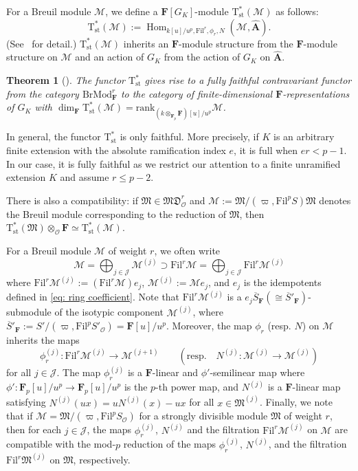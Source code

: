 \documentclass[11pt]{amsart}
\theoremstyle{definition}
\numberwithin{equation}{subsection}
\theoremstyle{plain}
\newtheorem{theo}[equation]{Theorem}
\theoremstyle{plain}
\theoremstyle{plain}
\theoremstyle{plain}
\theoremstyle{plain}
\theoremstyle{plain}
\theoremstyle{plain}
\theoremstyle{plain}
\theoremstyle{plain}
\theoremstyle{plain}
\theoremstyle{plain}
\theoremstyle{plain}
\theoremstyle{definition}
\theoremstyle{definition}
\theoremstyle{definition}
\theoremstyle{remark}
\renewcommand{\(}{\textup{(}}
\renewcommand{\)}{\textup{)}}
\DeclareMathOperator{\Hom}{Hom}
\newcommand{\F}{\mathbf{F}}
\newcommand{\barS}{\overline{S}}
\newcommand{\Tst}{\mathrm{T}_{\mathrm{st}}}
\newcommand{\cM}{\mathcal{M}}
\newcommand{\fM}{\mathfrak{M}}
\newcommand{\Fil}{\mathrm{Fil}}
\newcommand{\cO}{\mathcal{O}}
\newcommand{\cJ}{\mathcal{J}}
\begin{document}
For a Breuil module $\cM$, we define a $\F[G_K]$-module $\Tst^\ast(\cM)$ as follows: 
\begin{equation}\label{eq: definition of Tst}
\Tst^\ast(\cM):=\Hom_{k[u]/u^{p},\Fil^r,\phi_{r},N}(\cM,\widehat{\mathbf{A}}).
\end{equation} 
(See~\cite{EGH} for detail.) $\Tst^\ast(\cM)$ inherits an $\F$-module structure from the $\F$-module structure on $\cM$ and an action of $G_{K}$ from the action of $G_{K}$ on $\widehat{\mathbf{A}}$.
\begin{theo}[\cite{Caruso}]
The functor $\Tst^\ast$ gives rise to a fully faithful contravariant functor from the category $\mathrm{BrMod}^{r}_{\F}$ to the category of finite-dimensional $\F$-representations of $G_{K}$ with $\dim_{\F}\Tst^\ast(\cM)=\mathrm{rank}_{(k\otimes_{\F_p}\F)[u]/u^{p}}\cM$.
\end{theo}

In general, the functor $\Tst^\ast$ is only faithful. More precisely, if $K$ is an arbitrary finite extension with the absolute ramification index $e$, it is full when $er<p-1$. In our case, it is fully faithful as we restrict our attention to a finite unramified extension $K$ and assume $r\leq p-2$.


There is also a compatibility: if $\fM\in\mathfrak{MD}^{r}_{\cO}$ and $\cM:=\fM/(\varpi,\Fil^{p}S)\fM$ denotes the Breuil module corresponding to the reduction of $\fM$, then $\Tst^\ast(\fM)\otimes_{\cO}\F\simeq\Tst^\ast(\cM)$.



For a Breuil module $\cM$ of weight $r$, we often write
$$\cM=\bigoplus_{j\in\cJ}\cM^{(j)}\supset \Fil^r\cM=\bigoplus_{j\in\cJ} \Fil^r\cM^{(j)}$$
where $\Fil^r\cM^{(j)}:=(\Fil^r\cM) e_j$, $\cM^{(j)}:=\cM e_j$, and $e_j$ is the idempotents defined in \eqref{eq: ring coefficient}. Note that $\Fil^r\cM^{(j)}$ is a $e_j\barS_\F (\cong \barS'_\F)$-submodule of the isotypic component $\cM^{(j)}$, where $\barS'_\F:=S'/(\varpi,\Fil^pS'_\cO)=\F[u]/u^p$. Moreover, the map $\phi_r$ (resp. $N$) on $\cM$ inherits the maps
$$\phi_r^{(j)}:\Fil^r\cM^{(j)}\rightarrow \cM^{(j+1)}\qquad(\mbox{resp.}\quad N^{(j)}:\cM^{(j)}\rightarrow \cM^{(j)})$$
for all $j\in\cJ$. The map $\phi_r^{(j)}$ is a $\F$-linear and $\phi'$-semilinear map where $\phi':\F_p[u]/u^p\rightarrow \F_p[u]/u^p$ is the $p$-th power map, and $N^{(j)}$ is a $\F$-linear map satisfying $N^{(j)}(ux)=uN^{(j)}(x)-ux$ for all $x\in\fM^{(j)}$. Finally, we note that if $\cM=\fM/(\varpi,\Fil^pS_\cO)$ for a strongly divisible module $\fM$ of weight $r$, then for each $j\in\cJ$, the maps $\phi_r^{(j)}$, $N^{(j)}$ and the filtration $\Fil^{r}\cM^{(j)}$ on $\cM$ are compatible with the mod-$p$ reduction of  the maps $\phi_r^{(j)}$, $N^{(j)}$, and the filtration $\Fil^{r}\fM^{(j)}$ on $\fM$, respectively.
\end{document}
